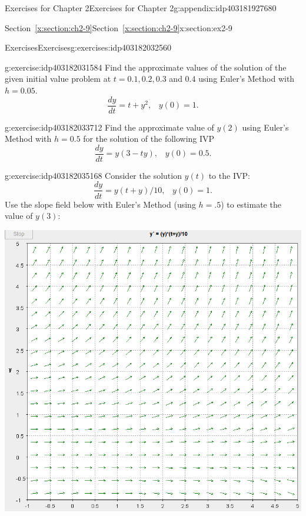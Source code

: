 \documentclass[oneside,10pt,]{book}
\newcommand{\xreffont}{\relax}
\numberwithin{equation}{section}
\numberwithin{equation}{section}
\begin{document}
\begin{appendixptx}{Exercises for Chapter 2}{}{Exercises for Chapter 2}{}{}{g:appendix:idp403181927680}
\begin{sectionptx}{Section~{\xreffont\ref*{x:section:ch2-9}}}{}{Section~{\xreffont\ref*{x:section:ch2-9}}}{}{}{x:section:ex2-9}
\begin{exercises-subsection-numberless}{Exercises}{}{Exercises}{}{}{g:exercises:idp403182032560}
\begin{divisionexercise}{2}{}{}{g:exercise:idp403182031584}%
Find the approximate values of the solution of the given initial value problem at \(t=0.1,0.2,0.3\) and \(0.4\) using Euler's Method with \(h=0.05\).%
\begin{equation*}
\frac{dy}{dt}=t+y^{2},\,\,\,\,\,y(0)=1.
\end{equation*}
%
\end{divisionexercise}%
\begin{divisionexercise}{3}{}{}{g:exercise:idp403182033712}%
Find the approximate value of \(y\left(2\right)\) using Euler's Method with \(h=0.5\) for the solution of the following IVP%
\begin{equation*}
\frac{dy}{dt}=y\left(3-ty\right),\,\,\,\,\,y(0)=0.5.
\end{equation*}
%
\end{divisionexercise}%
\begin{divisionexercise}{4}{}{}{g:exercise:idp403182035168}%
Consider the solution \(y(t)\) to the IVP:%
\begin{equation*}
\frac{dy}{dt}=y\left(t+y\right)/10,\,\,\,\,\,y(0)=1.
\end{equation*}
Use the slope field below with Euler's Method (using \(h=.5\)) to estimate the value of \(y(3)\): \begin{image}{0}{1}{0}%
\includegraphics[width=\linewidth]{images/2.9-4.png}
\end{image}%
%
\end{divisionexercise}%
\end{exercises-subsection-numberless}
\end{sectionptx}
\end{appendixptx}
\end{document}
